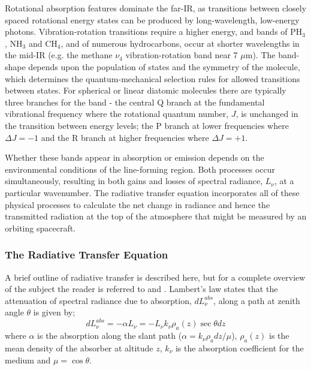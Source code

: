 \documentclass[final,5p,times,twocolumn,authoryear]{elsarticle}
\begin{document}
Rotational absorption features dominate the far-IR, as transitions between closely spaced rotational energy states can be produced by long-wavelength, low-energy photons.  Vibration-rotation transitions require a higher energy, and bands of PH$_3$, NH$_3$ and CH$_4$, and of numerous hydrocarbons, occur at shorter wavelengths in the mid-IR (e.g. the methane $\nu_4$ vibration-rotation band near 7 $\mu$m).  The band-shape depends upon the population of states and the symmetry of the molecule, which determines the quantum-mechanical selection rules for allowed transitions between states.  For spherical or linear diatomic molecules there are typically three branches for the band - the central Q branch at the fundamental vibrational frequency where the rotational quantum number, $J$, is unchanged in the transition between energy levels; the P branch at lower frequencies where $\Delta J = -1$ and the R branch at higher frequencies where $\Delta J = +1$.  

Whether these bands appear in absorption or emission depends on the environmental conditions of the line-forming region.  Both processes occur simultaneously, resulting in both gains and losses of spectral radiance, $L_\nu$, at a particular wavenumber.  The radiative transfer equation incorporates all of these physical processes to calculate the net change in radiance and hence the transmitted radiation at the top of the atmosphere that might be measured by an orbiting spacecraft.

\subsubsection{The Radiative Transfer Equation}

A brief outline of radiative transfer is described here, but for a complete overview of the subject the reader is referred to \citet{89goody} and \citet{03hanel}.  Lambert's law states that the attenuation of spectral radiance due to absorption, $dL_{\nu}^{abs}$, along a path at zenith angle $\theta$ is given by;
\begin{equation}
dL_{\nu}^{abs}=-\alpha L_{\nu}= - L_{\nu}k_{\nu} \rho_a(z) \sec \theta dz
\end{equation}
where $\alpha$ is the absorption along the slant path ($\alpha=k_{\nu}\rho_a dz/\mu$), $\rho_a(z)$ is the mean density of the absorber at altitude $z$, $k_\nu$ is the absorption coefficient for the medium and $\mu=\cos \theta$.
\end{document}

